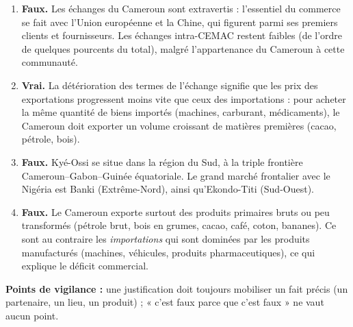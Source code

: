 \documentclass[11pt]{article}
\newcommand{\cle}[1]{{\popxbold\color{popdark}#1}}
\begin{document}
\begin{corrige}
\begin{enumerate}
\item \textbf{Faux.} Les échanges du Cameroun sont \cle{extravertis} : l'essentiel du commerce se fait avec l'Union européenne et la Chine, qui figurent parmi ses premiers clients et fournisseurs. Les échanges intra-CEMAC restent faibles (de l'ordre de quelques pourcents du total), malgré l'appartenance du Cameroun à cette communauté.
\item \textbf{Vrai.} La détérioration des termes de l'échange signifie que les prix des exportations progressent moins vite que ceux des importations : pour acheter la même quantité de biens importés (machines, carburant, médicaments), le Cameroun doit exporter un volume croissant de matières premières (cacao, pétrole, bois).
\item \textbf{Faux.} Kyé-Ossi se situe dans la région du Sud, à la triple frontière Cameroun--Gabon--Guinée équatoriale. Le grand marché frontalier avec le Nigéria est Banki (Extrême-Nord), ainsi qu'Ekondo-Titi (Sud-Ouest).
\item \textbf{Faux.} Le Cameroun exporte surtout des produits primaires bruts ou peu transformés (pétrole brut, bois en grumes, cacao, café, coton, bananes). Ce sont au contraire les \emph{importations} qui sont dominées par les produits manufacturés (machines, véhicules, produits pharmaceutiques), ce qui explique le déficit commercial.
\end{enumerate}
\textbf{Points de vigilance :} une justification doit toujours mobiliser un fait précis (un partenaire, un lieu, un produit) ; « c'est faux parce que c'est faux » ne vaut aucun point.
\end{corrige}
\end{document}
